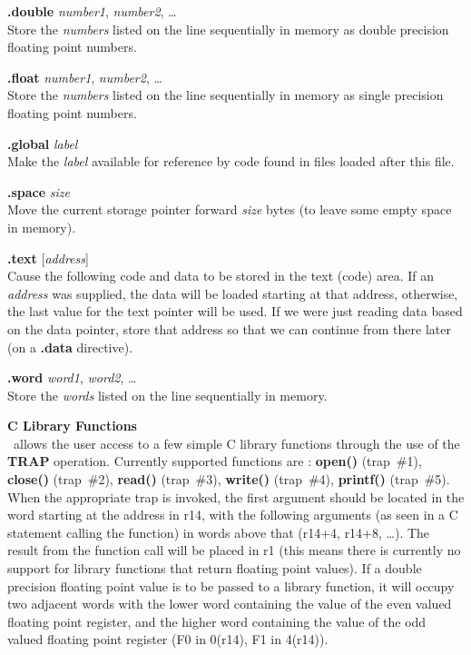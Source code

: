 \begin{mylist}
\begin{mylist}
\item[{\bf .double} {\em number1}, {\em number2}, \ldots]
\nopagebreak \hfill \\
Store the {\em numbers} listed on the line sequentially in memory as
double precision floating point numbers.

\item[{\bf .float} {\em number1}, {\em number2}, \ldots]
\nopagebreak \hfill \\
Store the {\em numbers} listed on the line sequentially in memory as
single precision floating point numbers.

\item[{\bf .global} {\em label}]
\nopagebreak \hfill \\
Make the {\em label} available for reference by code found in files
loaded after this file.

\item[{\bf .space} {\em size}]
\nopagebreak \hfill \\
Move the current storage pointer forward {\em size} bytes (to leave some
empty space in memory).

\item[{\bf .text} {[}{\em address}{]}]
\nopagebreak \hfill \\
Cause the following code and data to be stored in the text (code)
area.  If an {\em address} was supplied, the data will be loaded
starting at that address, otherwise, the last value for the text
pointer will be used.  If we were just reading data based on the data
pointer, store that address so that we can continue from there later
(on a {\bf .data} directive).

\item[{\bf .word} {\em word1}, {\em word2}, \ldots]
\nopagebreak \hfill \\
Store the {\em words} listed on the line sequentially in memory.

\end{mylist}

\item[{\bf C Library Functions}]
\nopagebreak \hfill \\
\dlxsim\ allows the user access to a few simple C library functions
through the use of the {\bf TRAP} operation.  Currently supported
functions are : {\bf open()} (trap~\#1), {\bf close()} (trap~\#2),
{\bf read()} (trap~\#3), {\bf write()} (trap~\#4), {\bf printf()}
(trap~\#5).  When the appropriate trap is invoked, the first argument
should be located in the word starting at the address in r14, with the
following arguments (as seen in a C statement calling the function) in
words above that (r14+4, r14+8, \ldots).  The result from the function
call will be placed in r1 (this means there is currently no support
for library functions that return floating point values).  If a double
precision floating point value is to be passed to a library function,
it will occupy two adjacent words with the lower word containing the
value of the even valued floating point register, and the higher word
containing the value of the odd valued floating point register (F0 in
0(r14), F1 in 4(r14)).


\end{mylist}
